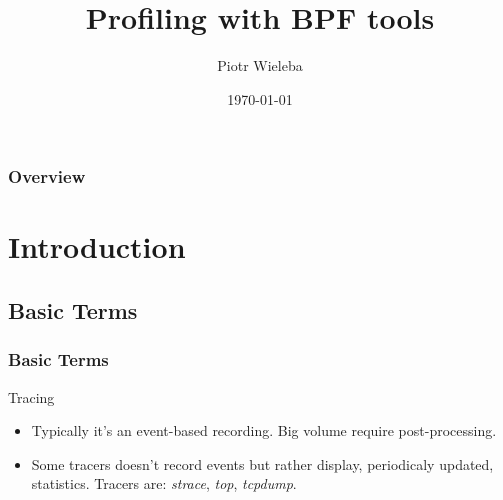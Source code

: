 \documentclass{beamer}
\title[BFP Tools]{Profiling with BPF tools} %
\author{Piotr Wieleba} %
\institute[DataArt] %
{
DataArt\\ %
\medskip
\textit{piotr.wieleba@dataart.com} %
}
\date{\today} %
\begin{document}
\begin{frame}
\titlepage %
\end{frame}


\begin{frame}
\frametitle{Overview} %
\tableofcontents %
\end{frame}


\section{Introduction} %
\subsection{Basic Terms}

\begin{frame}
  \frametitle{Basic Terms}
  \begin{block}{Tracing}
    \begin{itemize}
      \item<1-> Typically it's an event-based recording.  Big volume require post-processing.
      \item<2-> Some tracers doesn't record events but rather display, periodicaly updated, statistics. Tracers are: \emph{strace}, \emph{top}, \emph{tcpdump}. 
    \end{itemize}
  \end{block}
\end{frame}
\end{document}
